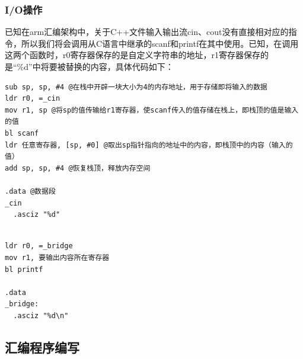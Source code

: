 \documentclass[UTF8,a4paper,10pt]{ctexart}
\begin{document}
\subsubsection{I/O操作}
已知在arm汇编架构中，关于C++文件输入输出流cin、cout没有直接相对应的指令，所以我们将会调用从C语言中继承的scanf和printf在其中使用。已知，在调用这两个函数时，r0寄存器保存的是自定义字符串的地址，r1寄存器保存的是“\%d”中将要被替换的内容，具体代码如下：
\begin{lstlisting}[title = arm汇编语言中的输入流模版]
sub sp, sp, #4 @在栈中开辟一块大小为4的内存地址，用于存储即将输入的数据
ldr r0, =_cin
mov r1, sp @将sp的值传输给r1寄存器，使scanf传入的值存储在栈上，即栈顶的值是输入的值
bl scanf
ldr 任意寄存器, [sp, #0] @取出sp指针指向的地址中的内容，即栈顶中的内容（输入的值）
add sp, sp, #4 @恢复栈顶，释放内存空间

.data @数据段
_cin 
  .asciz "%d"
\end{lstlisting}
\newpage
\begin{lstlisting}[title = arm汇编语言中的输出流模版]

ldr r0, =_bridge
mov r1, 要输出内容所在寄存器 
bl printf

.data
_bridge:
  .asciz "%d\n"
\end{lstlisting}
\subsection{汇编程序编写}
\end{document}
